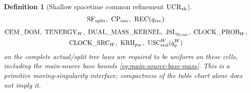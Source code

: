 \documentclass[11pt]{article}
\newtheorem{definition}[theorem]{Definition}
\begin{document}
\begin{definition}[Shallow spacetime common refinement
$\mathrm{UCR}_{\rm sh}$]
\[\begin{gathered}
 \mathrm{SF}_{\rm split},\ \mathrm{CP}_{\rm env},\
 \mathrm{REC}(q_{\rm rec})
 \end{gathered}
\]
\[
 \begin{gathered}
 \mathrm{CEM\_DOM},\ \mathrm{TENERGY}_{W},\
 \mathrm{DUAL\_MASS\_KERNEL},\ \mathrm{JSL}_{p_{\rm joint}},\
 \mathrm{CLOCK\_PROB}_{W},\\
 \mathrm{CLOCK\_SRC}_{W},\ \mathrm{KRH}_{p_W},\
 \mathrm{USC}_{\rm end}^{W}(q_g^W)
 \end{gathered}
\]
on the complete actual/split tree laws are required to be uniform on these
cells, including the main-source base bounds
\eqref{eq:main-source-base-mass}.
This is a primitive moving-singularity interface; compactness of the table
chart alone does not imply it.
\end{definition}
\end{document}
